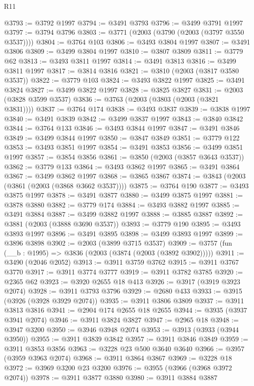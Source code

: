 \begin{lexlean}{R11}
\begin{coremodule}
@3793 := @3792 @1997
@3794 := @3491 @3793
@3796 := @3499 @3791 @1997
@3797 := @3794 @3796
@3803 := @3771 (@2003 (@3790 (@2003 (@3797 @3550 @3537))))
@3804 := @3764 @103
@3806 := @3493 @3804 @1997
@3807 := @3491 @3806
@3809 := @3499 @3804 @1997
@3810 := @3807 @3809
@3811 := @3779 @62
@3813 := @3493 @3811 @1997
@3814 := @3491 @3813
@3816 := @3499 @3811 @1997
@3817 := @3814 @3816
@3821 := @3810 (@2003 (@3817 @3580 @3537))
@3822 := @3779 @103
@3824 := @3493 @3822 @1997
@3825 := @3491 @3824
@3827 := @3499 @3822 @1997
@3828 := @3825 @3827
@3831 := @2003 (@3828 @3599 @3537)
@3836 := @3763 (@2003 (@3803 (@2003 (@3821 @3831))))
@3837 := @3764 @174
@3838 := @3493 @3837
@3839 := @3838 @1997
@3840 := @3491 @3839
@3842 := @3499 @3837 @1997
@3843 := @3840 @3842
@3844 := @3764 @133
@3846 := @3493 @3844 @1997
@3847 := @3491 @3846
@3849 := @3499 @3844 @1997
@3850 := @3847 @3849
@3851 := @3779 @122
@3853 := @3493 @3851 @1997
@3854 := @3491 @3853
@3856 := @3499 @3851 @1997
@3857 := @3854 @3856
@3861 := @3850 (@2003 (@3857 @3643 @3537))
@3862 := @3779 @133
@3864 := @3493 @3862 @1997
@3865 := @3491 @3864
@3867 := @3499 @3862 @1997
@3868 := @3865 @3867
@3874 := @3843 (@2003 (@3861 (@2003 (@3868 @3662 @3537))))
@3875 := @3764 @190
@3877 := @3493 @3875 @1997
@3878 := @3491 @3877
@3880 := @3499 @3875 @1997
@3881 := @3878 @3880
@3882 := @3779 @174
@3884 := @3493 @3882 @1997
@3885 := @3491 @3884
@3887 := @3499 @3882 @1997
@3888 := @3885 @3887
@3892 := @3881 (@2003 (@3888 @3690 @3537))
@3893 := @3779 @190
@3895 := @3493 @3893 @1997
@3896 := @3491 @3895
@3898 := @3499 @3893 @1997
@3899 := @3896 @3898
@3902 := @2003 (@3899 @3715 @3537)
@3909 := @3757 (fun (__b : @1995) => @3836 (@2003 (@3874 (@2003 (@3892 @3902)))))
@3911 := @3490 (@2046 @2052)
@3913 := @3911 @3759 @3762
@3915 := @3911 @3767 @3770
@3917 := @3911 @3774 @3777
@3919 := @3911 @3782 @3785
@3920 := @2365 @62
@3923 := @3920 @2655 @18 @413
@3926 := @3917 (@3919 @3923 @2074)
@3928 := @3911 @3793 @3796
@3929 := @2680 @433
@3933 := @3915 (@3926 (@3928 @3929 @2074))
@3935 := @3911 @3806 @3809
@3937 := @3911 @3813 @3816
@3941 := @2904 @174 @2655 @18 @2655
@3944 := @3935 (@3937 @3941 @2074)
@3946 := @3911 @3824 @3827
@3947 := @2965 @18
@3948 := @3947 @3200
@3950 := @3946 @3948 @2074
@3953 := @3913 (@3933 (@3944 @3950))
@3955 := @3911 @3839 @3842
@3957 := @3911 @3846 @3849
@3959 := @3911 @3853 @3856
@3963 := @3228 @23 @500 @3640 @3640
@3966 := @3957 (@3959 @3963 @2074)
@3968 := @3911 @3864 @3867
@3969 := @3228 @18
@3972 := @3969 @3200 @23 @3200
@3976 := @3955 (@3966 (@3968 @3972 @2074))
@3978 := @3911 @3877 @3880
@3980 := @3911 @3884 @3887

\end{coremodule}
\end{lexlean}

